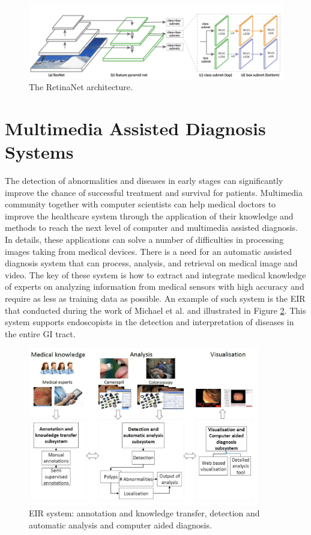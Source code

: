 \begin{figure}[thb]
    \centering
    \includegraphics[width=\textwidth]{endoscopy_resources/retinanet.png}
    \caption{The RetinaNet architecture.\cite{Retina}}
    \label{fig:retina_arch}
\end{figure}
\section{Multimedia Assisted Diagnosis Systems}
The detection of abnormalities and diseases in early stages can significantly improve the chance of successful treatment and survival for patients. Multimedia community together with computer scientists can help medical doctors to improve the healthcare system through the application of their knowledge and methods to reach the next level of computer and multimedia assisted diagnosis. In details, these applications can solve a number of difficulties in processing images taking from medical devices. There is a need for an automatic assisted diagnosis system that can process, analysis, and retrieval on medical image and video. The key of these system is how to extract and integrate medical knowledge of experts on analyzing information from medical sensors with high accuracy and require as less as training data as possible. An example of such system is the EIR that conducted during the work of Michael et al. \cite{teammates} and illustrated in Figure \ref{fig:eir_system}. This system supports endoscopists in  the
detection and interpretation of diseases in the entire GI tract.
\begin{figure}[thb]
    \centering
    \includegraphics[width=0.9\textwidth]{endoscopy_resources/eir_system.png}
    \caption{EIR system: annotation and knowledge transfer, detection and automatic analysis and computer aided diagnosis.}
    \label{fig:eir_system}
\end{figure}

